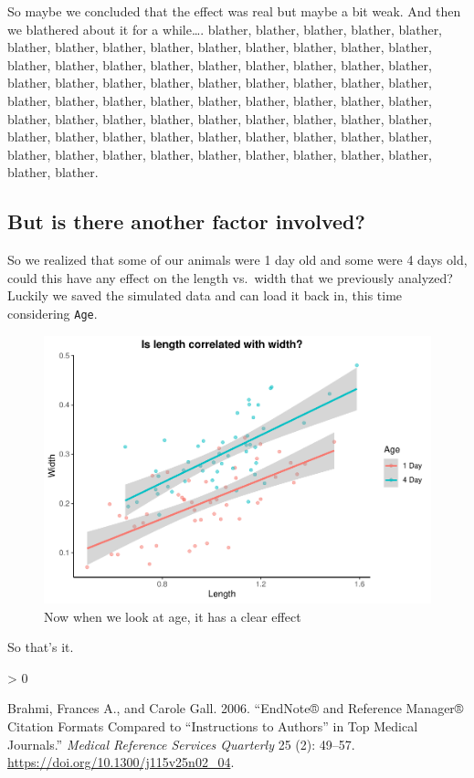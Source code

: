 \documentclass[
  twocolumn]{article}
\newlength{\cslhangindent}
\newenvironment{CSLReferences}[2] %
 {%
  \setlength{\parindent}{0pt}
  \ifodd #1 \everypar{\setlength{\hangindent}{\cslhangindent}}\ignorespaces\fi
  \ifnum #2 > 0
  \setlength{\parskip}{#2\baselineskip}
  \fi
 }%
 {}
\begin{document}
So maybe we concluded that the effect was real but maybe a bit weak. And
then we blathered about it for a while\ldots. blather, blather, blather,
blather, blather, blather, blather, blather, blather, blather, blather,
blather, blather, blather, blather, blather, blather, blather, blather,
blather, blather, blather, blather, blather, blather, blather, blather,
blather, blather, blather, blather, blather, blather, blather, blather,
blather, blather, blather, blather, blather, blather, blather, blather,
blather, blather, blather, blather, blather, blather, blather, blather,
blather, blather, blather, blather, blather, blather, blather, blather,
blather, blather, blather, blather, blather, blather, blather, blather,
blather, blather, blather.

\hypertarget{but-is-there-another-factor-involved}{%
\subsection{But is there another factor
involved?}\label{but-is-there-another-factor-involved}}

So we realized that some of our animals were 1 day old and some were 4
days old, could this have any effect on the length vs.~width that we
previously analyzed? Luckily we saved the simulated data and can load it
back in, this time considering \texttt{Age}.

\begin{figure}
\centering
\includegraphics{2_Col_template_files/figure-latex/unnamed-chunk-3-1.pdf}
\caption{Now when we look at age, it has a clear effect}
\end{figure}

So that's it.

\hypertarget{refs}{}
\begin{CSLReferences}{1}{0}
\leavevmode\hypertarget{ref-Brahmi2006}{}%
Brahmi, Frances A., and Carole Gall. 2006. {``EndNote® and Reference
Manager® Citation Formats Compared to {``}Instructions to Authors{''} in
Top Medical Journals.''} \emph{Medical Reference Services Quarterly} 25
(2): 49--57. \url{https://doi.org/10.1300/j115v25n02_04}.

\end{CSLReferences}
\end{document}
